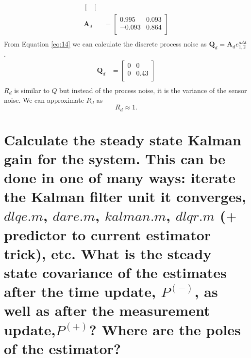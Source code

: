 \documentclass[12pt,letterpaper, onecolumn]{exam}
\begin{document}
\begin{questions}
\begin{parts}
{\begin{equation}
\begin{split}
\begin{bmatrix}
                \end{bmatrix} \\
                \mathbf{A}_d & =
                \begin{bmatrix}
                    0.995  & 0.093 \\
                    -0.093 & 0.864 \\
                \end{bmatrix}\\
            \end{split}
            \label{eq:14}
        \end{equation}
        From Equation \ref{eq:14} we can calculate the discrete process noise as $\mathbf{Q}_d = \mathbf{A}_de^{\mathbf{s}\Delta t}_{1,2}$.
        \begin{equation}
            \begin{split}
                \mathbf{Q}_d & =
                \begin{bmatrix}
                    0 & 0    \\
                    0 & 0.43 \\
                \end{bmatrix} \\
            \end{split}
            \label{eq:15}
        \end{equation}
        $R_d$ is similar to $Q$ but instead of the process noise, it is the variance of the sensor noise. We can approximate $R_d$ as \[R_d \approx 1. \]
        }
        \part{Calculate the steady state Kalman gain for the system. This can be done in one of many ways: iterate the Kalman filter unit it converges, $dlqe.m$, $dare.m$, $kalman.m$, $dlqr.m$ ($+$ predictor to current estimator trick), etc.
            What is the steady state covariance of the estimates after the time update, $P^{(-)}$, as well as after the measurement update,$P^{(+)}$? Where are the poles of the estimator?}


\end{parts}
\end{questions}
\end{document}
